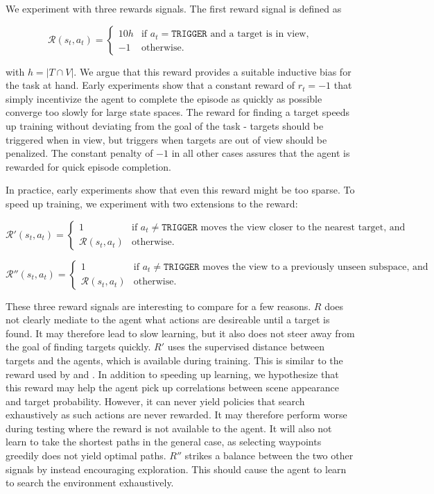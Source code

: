 We experiment with three rewards signals.
The first reward signal is defined as

\[
    \mathcal{R}(s_t, a_t) =
    \begin{cases}
        10h & \text{if \(a_t = \mathtt{TRIGGER}\) and a target is in view,} \\
        -1  & \text{otherwise.}
    \end{cases}
\]

with \(h = \left\lvert T \cap V \right\rvert\). 
We argue that this reward provides a suitable inductive bias for the task at hand.
Early experiments show that a constant reward of \(r_t = -1\) that simply incentivize the agent to complete the episode as quickly as possible converge too slowly for large state spaces.
The reward for finding a target speeds up training without deviating from the goal of the task -
targets should be triggered when in view, but triggers when targets are out of view should be penalized.
The constant penalty of \(-1\) in all other cases assures that the agent is rewarded for quick episode completion.

In practice, early experiments show that even this reward might be too sparse.
To speed up training, we experiment with two extensions to the reward:

\[
    \mathcal{R}'(s_t, a_t) =
    \begin{cases}
        1 & \text{if \(a_t \neq \mathtt{TRIGGER}\) moves the view closer to the nearest target, and} \\
        \mathcal{R}(s_t, a_t) & \text{otherwise}.
    \end{cases}
\]

\[
    \mathcal{R}''(s_t, a_t) =
    \begin{cases}
        1 & \text{if \(a_t \neq \mathtt{TRIGGER}\) moves the view to a previously unseen subspace, and} \\
        \mathcal{R}(s_t, a_t) & \text{otherwise}.
    \end{cases}
\]

These three reward signals are interesting to compare for a few reasons.
\(R\) does not clearly mediate to the agent what actions are desireable until a target is found.
It may therefore lead to slow learning, but it also does not steer away from the goal of finding targets quickly.
\(R'\) uses the supervised distance between targets and the agents, which is available during training.
This is similar to the reward used by \cite{caicedo_active_2015} and \cite{ghesu_artificial_2016}.
In addition to speeding up learning, we hypothesize that this reward may help the agent pick up correlations between scene appearance and target probability.
However, it can never yield policies that search exhaustively as such actions are never rewarded.
It may therefore perform worse during testing where the reward is not available to the agent.
It will also not learn to take the shortest paths in the general case, as selecting waypoints greedily does not yield optimal paths.
\(R''\) strikes a balance between the two other signals by instead encouraging exploration.
This should cause the agent to learn to search the environment exhaustively.

